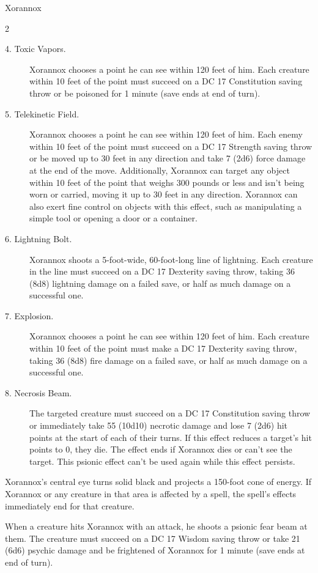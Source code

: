 \documentclass[10pt,a4paper,twoside,fancy,bg=print,twocolumn,openany,nodeprecatedcode]{dndbook}
\begin{document}
\begin{DndMonster}[float*=b,width=\textwidth + 8pt]{Xorannox}
\begin{multicols}{2}
\begin{description}
\item[4. Toxic Vapors.]
Xorannox chooses a point he can see within 120 feet of him. Each creature within 10 feet of the point must succeed on a DC 17 Constitution saving throw or be poisoned for 1 minute (save ends at end of turn).

\item[5. Telekinetic Field.]
Xorannox chooses a point he can see within 120 feet of him. Each enemy within 10 feet of the point must succeed on a DC 17 Strength saving throw or be moved up to 30 feet in any direction and take 7 (2d6) force damage at the end of the move. Additionally, Xorannox can target any object within 10 feet of the point that weighs 300 pounds or less and isn't being worn or carried, moving it up to 30 feet in any direction. Xorannox can also exert fine control on objects with this effect, such as manipulating a simple tool or opening a door or a container.

\item[6. Lightning Bolt.]
Xorannox shoots a 5-foot-wide, 60-foot-long line of lightning. Each creature in the line must succeed on a DC 17 Dexterity saving throw, taking 36 (8d8) lightning damage on a failed save, or half as much damage on a successful one.

\item[7. Explosion.]
Xorannox chooses a point he can see within 120 feet of him. Each creature within 10 feet of the point must make a DC 17 Dexterity saving throw, taking 36 (8d8) fire damage on a failed save, or half as much damage on a successful one.

\item[8. Necrosis Beam.]
The targeted creature must succeed on a DC 17 Constitution saving throw or immediately take 55 (10d10) necrotic damage and lose 7 (2d6) hit points at the start of each of their turns. If this effect reduces a target's hit points to 0, they die. The effect ends if Xorannox dies or can't see the target. This psionic effect can't be used again while this effect persists.

\end{description}

Xorannox's central eye turns solid black and projects a 150-foot cone of energy. If Xorannox or any creature in that area is affected by a spell, the spell's effects immediately end for that creature.

When a creature hits Xorannox with an attack, he shoots a psionic fear beam at them. The creature must succeed on a DC 17 Wisdom saving throw or take 21 (6d6) psychic damage and be frightened of Xorannox for 1 minute (save ends at end of turn).


\end{multicols}
\end{DndMonster}
\end{document}

